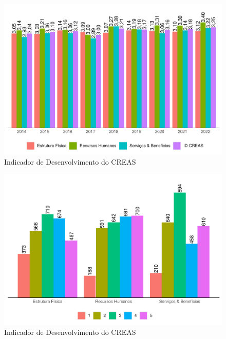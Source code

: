 \documentclass[
  brazilian]{report}
\begin{document}
\begin{figure}
\includegraphics{Censo-SUAS-2022_files/figure-latex/idcreas-1} \caption[Indicador de Desenvolvimento do CREAS]{Indicador de Desenvolvimento do CREAS}\label{fig:idcreas}
\end{figure}

\begin{figure}
\includegraphics{Censo-SUAS-2022_files/figure-latex/idcreas_est-1} \caption[Indicador de Desenvolvimento do CREAS]{Indicador de Desenvolvimento do CREAS}\label{fig:idcreas_est}
\end{figure}
\end{document}
